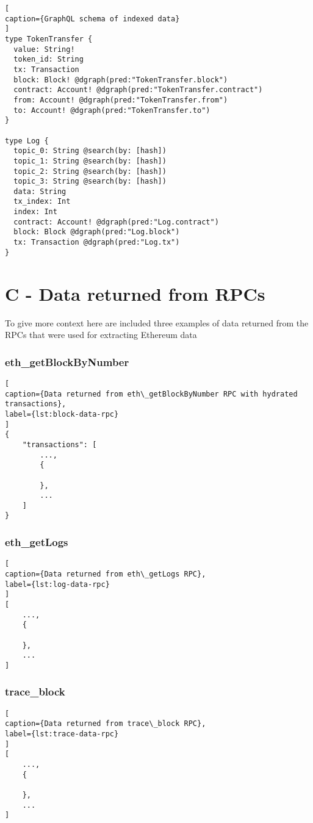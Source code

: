 \begin{lstlisting}[
caption={GraphQL schema of indexed data}
]
type TokenTransfer {
  value: String!
  token_id: String
  tx: Transaction
  block: Block! @dgraph(pred:"TokenTransfer.block")
  contract: Account! @dgraph(pred:"TokenTransfer.contract")
  from: Account! @dgraph(pred:"TokenTransfer.from")
  to: Account! @dgraph(pred:"TokenTransfer.to")
}

type Log {
  topic_0: String @search(by: [hash])
  topic_1: String @search(by: [hash])
  topic_2: String @search(by: [hash])
  topic_3: String @search(by: [hash])
  data: String 
  tx_index: Int
  index: Int
  contract: Account! @dgraph(pred:"Log.contract")
  block: Block @dgraph(pred:"Log.block")
  tx: Transaction @dgraph(pred:"Log.tx")
}
\end{lstlisting}

\chapter*{C - Data returned from RPCs}

To give more context here are included three examples of data returned from the RPCs that were used for extracting Ethereum data 


\subsection*{eth\_getBlockByNumber}

\begin{lstlisting}[
caption={Data returned from eth\_getBlockByNumber RPC with hydrated transactions},
label={lst:block-data-rpc}
]
{
    "transactions": [
        ...,
        {
        
        },
        ...
    ]
}
\end{lstlisting}

\subsection*{eth\_getLogs}

\begin{lstlisting}[
caption={Data returned from eth\_getLogs RPC},
label={lst:log-data-rpc}
]
[
    ...,
    {
    
    },
    ...
]
\end{lstlisting}

\subsection*{trace\_block}

\begin{lstlisting}[
caption={Data returned from trace\_block RPC},
label={lst:trace-data-rpc}
]
[
    ...,
    {
    
    },
    ...
]
\end{lstlisting}
